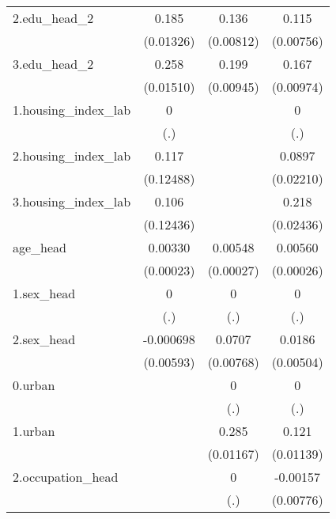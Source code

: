 \begin{table}[htbp]
{\begin{tabular}{l*{3}{c}}
2.edu_head_2&       0.185\sym{***}&       0.136\sym{***}&       0.115\sym{***}\\
            &   (0.01326)         &   (0.00812)         &   (0.00756)         \\
3.edu_head_2&       0.258\sym{***}&       0.199\sym{***}&       0.167\sym{***}\\
            &   (0.01510)         &   (0.00945)         &   (0.00974)         \\
1.housing_index_lab&           0         &                     &           0         \\
            &         (.)         &                     &         (.)         \\
2.housing_index_lab&       0.117         &                     &      0.0897\sym{***}\\
            &   (0.12488)         &                     &   (0.02210)         \\
3.housing_index_lab&       0.106         &                     &       0.218\sym{***}\\
            &   (0.12436)         &                     &   (0.02436)         \\
age_head    &     0.00330\sym{***}&     0.00548\sym{***}&     0.00560\sym{***}\\
            &   (0.00023)         &   (0.00027)         &   (0.00026)         \\
1.sex_head  &           0         &           0         &           0         \\
            &         (.)         &         (.)         &         (.)         \\
2.sex_head  &   -0.000698         &      0.0707\sym{***}&      0.0186\sym{***}\\
            &   (0.00593)         &   (0.00768)         &   (0.00504)         \\
0.urban     &                     &           0         &           0         \\
            &                     &         (.)         &         (.)         \\
1.urban     &                     &       0.285\sym{***}&       0.121\sym{***}\\
            &                     &   (0.01167)         &   (0.01139)         \\
2.occupation_head&                     &           0         &    -0.00157         \\
            &                     &         (.)         &   (0.00776)         \\

\end{tabular}}
\end{table}
